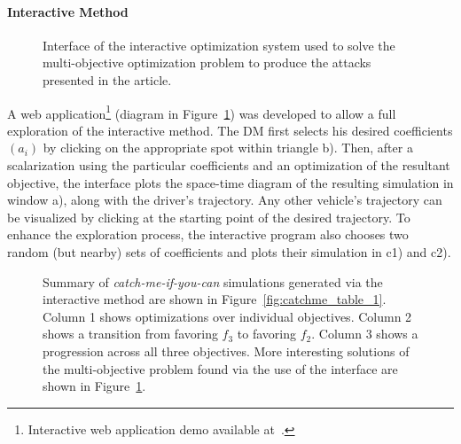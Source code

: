 \paragraph{Interactive Method}


\begin{figure}[t]
\centering
{}%
%

\caption{Interface of the interactive optimization system used to solve the multi-objective optimization problem to produce the attacks presented in the article.}

\label{fig:webinterface}
\end{figure}

 A web application\footnote{Interactive web application demo available at~\cite{smartroadswebsite}.} (diagram in Figure~\ref{fig:webinterface}) was developed to allow a full exploration of the interactive method. The DM first selects his desired coefficients $(a_i)$ by clicking on the appropriate spot within triangle b). Then, after a scalarization using the particular coefficients and an optimization of the resultant objective, the interface plots the space-time diagram of the resulting simulation in window a), along with the driver's trajectory. Any other vehicle's trajectory can be visualized by clicking at the starting point of the desired trajectory. To enhance the exploration process, the interactive program also chooses two random (but nearby) sets of coefficients and plots their simulation in c1) and c2).

\begin{figure}[t]
    \centering
    \hfill
    \caption{Summary of \emph{catch-me-if-you-can} simulations generated via the interactive method are shown in Figure~\ref{fig:catchme_table_1}. Column 1 shows optimizations over individual objectives. Column 2 shows a transition from favoring $f_3$ to favoring $f_2$. Column 3 shows a progression across all three objectives. More interesting solutions of the multi-objective problem found via the use of the interface are shown in Figure~\ref{fig:webinterface}.}    
\end{figure}

